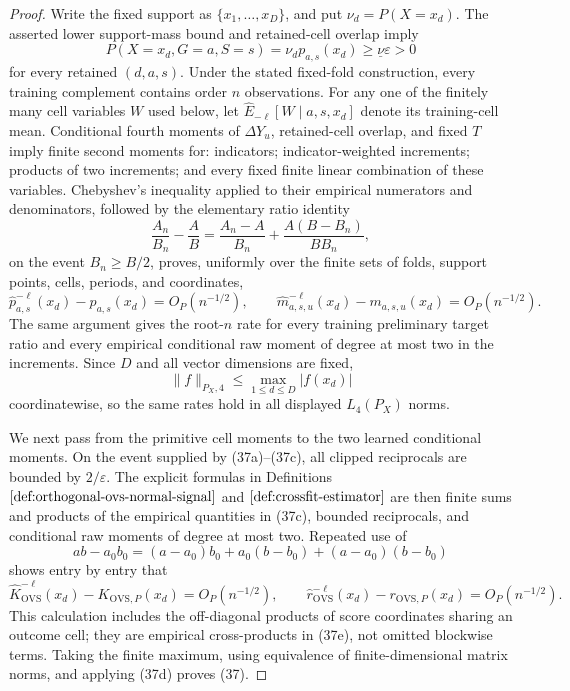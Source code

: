 \documentclass{article}
\begin{document}
\begin{proof}
Write the fixed support as \(\{x_1,\ldots,x_D\}\), and put \(\nu_d=P(X=x_d)\).  The asserted lower support-mass bound and retained-cell overlap imply
\[
P(X=x_d,G=a,S=s)=\nu_d p_{a,s}(x_d)\ge \underline\nu\varepsilon>0
\tag{37a}
\]
for every retained \((d,a,s)\).  Under the stated fixed-fold construction, every training complement contains order \(n\) observations.  For any one of the finitely many cell variables \(W\) used below, let \(\widehat E_{-\ell}[W\mid a,s,x_d]\) denote its training-cell mean.  Conditional fourth moments of \(\Delta Y_u\), retained-cell overlap, and fixed \(T\) imply finite second moments for: indicators; indicator-weighted increments; products of two increments; and every fixed finite linear combination of these variables.  Chebyshev's inequality applied to their empirical numerators and denominators, followed by the elementary ratio identity
\[
\frac{A_n}{B_n}-\frac{A}{B}
=\frac{A_n-A}{B_n}+\frac{A(B-B_n)}{BB_n},
\tag{37b}
\]
on the event \(B_n\ge B/2\), proves, uniformly over the finite sets of folds, support points, cells, periods, and coordinates,
\[
\widehat p_{a,s}^{-\ell}(x_d)-p_{a,s}(x_d)=O_P(n^{-1/2}),
\qquad
\widehat m_{a,s,u}^{-\ell}(x_d)-m_{a,s,u}(x_d)=O_P(n^{-1/2}).
\tag{37c}
\]
The same argument gives the root-\(n\) rate for every training preliminary target ratio and every empirical conditional raw moment of degree at most two in the increments.  Since \(D\) and all vector dimensions are fixed,
\[
\|f\|_{P_X,4}\le \max_{1\le d\le D}|f(x_d)|
\tag{37d}
\]
coordinatewise, so the same rates hold in all displayed \(L_4(P_X)\) norms.

We next pass from the primitive cell moments to the two learned conditional moments.  On the event supplied by (37a)--(37c), all clipped reciprocals are bounded by \(2/\varepsilon\).  The explicit formulas in Definitions \(\ref{def:orthogonal-ovs-normal-signal}\) and \(\ref{def:crossfit-estimator}\) are then finite sums and products of the empirical quantities in (37c), bounded reciprocals, and conditional raw moments of degree at most two.  Repeated use of
\[
ab-a_0b_0=(a-a_0)b_0+a_0(b-b_0)+(a-a_0)(b-b_0)
\tag{37e}
\]
shows entry by entry that
\[
\widehat K_{\mathrm{OVS}}^{-\ell}(x_d)-K_{\mathrm{OVS},P}(x_d)
=O_P(n^{-1/2}),
\qquad
\widehat r_{\mathrm{OVS}}^{-\ell}(x_d)-r_{\mathrm{OVS},P}(x_d)
=O_P(n^{-1/2}).
\tag{37f}
\]
This calculation includes the off-diagonal products of score coordinates sharing an outcome cell; they are empirical cross-products in (37e), not omitted blockwise terms.  Taking the finite maximum, using equivalence of finite-dimensional matrix norms, and applying (37d) proves (37).


\end{proof}
\end{document}
